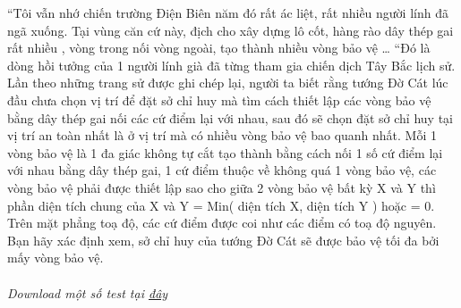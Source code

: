 “Tôi vẫn nhớ chiến trường Điện Biên năm đó rất ác liệt, rất nhiều người lính đã ngã xuống. Tại vùng căn cứ này, địch cho xây dựng lô cốt, hàng rào dây thép gai rất nhiều , vòng trong nối vòng ngoài, tạo thành nhiều vòng bảo vệ … “Đó là dòng hồi tưởng của 1 người lính già đã từng tham gia chiến dịch Tây Bắc lịch sử. Lần theo những trang sử được ghi chép lại, người ta biết rằng tướng Đờ Cát lúc đầu chưa chọn vị trí để đặt sở chỉ huy mà tìm cách thiết lập các vòng bảo vệ bằng dây thép gai nối các cứ điểm lại với nhau, sau đó sẽ chọn đặt sở chỉ huy tại vị trí an toàn nhất là ở vị trí mà có nhiều vòng bảo vệ bao quanh nhất. Mỗi 1 vòng bảo vệ là 1 đa giác không tự cắt tạo thành bằng cách nối 1 số cứ điểm lại với nhau bằng dây thép gai, 1 cứ điểm thuộc về không quá 1 vòng bảo vệ, các vòng bảo vệ phải được thiết lập sao cho giữa 2 vòng bảo vệ bất kỳ X và Y thì phần diện tích chung của X và Y = Min( diện tích X, diện tích Y ) hoặc = 0. Trên mặt phẳng toạ độ, các cứ điểm được coi như các điểm có toạ độ nguyên. Bạn hãy xác định xem, sở chỉ huy của tướng Đờ Cát sẽ được bảo vệ tối đa bởi mấy vòng bảo vệ.   
\\
\\\textit{    Download một số test tại    \href{http://vn.spoj.pl/content/MILITARY.rar}{     đây    }}

\